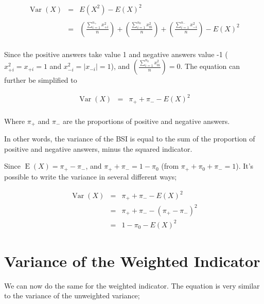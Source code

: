 \documentclass[12pt,a4paper,oneside]{book}
\DeclareMathOperator{\Var}{Var}
\DeclareMathOperator{\E}{E}
\begin{document}
\begin{eqnarray}
\Var(X) &=&  E\left( X^2\right) - E\left( X\right)^2 \nonumber \\ \nonumber \\
    &=& \left( \frac{\sum_{i=1}^{n_+} x_{+i}^2}{n} \right)  + \left( \frac{\sum_{i=1}^{n_0} x_{0i}^2}{n} \right) + \left( \frac{\sum_{i=1}^{n_-} x_{-i}^2}{n} \right) - E(X)^2 \\ \nonumber 
\end{eqnarray}


Since the positive answers take value 1 and negative answers value -1 ($x_{+i}^2 = x_{+i} = 1$ and $x_{-i}^2 = |x_{-i}| = 1$), and $\left( \frac{\sum_{i=1}^{n_0} x_{0i}^2}{n} \right) = 0$. 
The equation can further be simplified to

\begin{eqnarray}
    \Var(X) &=& \pi_+ + \pi_- - E ( X )^2 \label{var1} \\ \nonumber
\end{eqnarray}

Where $\pi_+$ and $\pi_-$ are the proportions of positive and negative answers.

In other words, the variance of the BSI is equal to the sum of the proportion of positive and negative answers, minus the squared indicator.

Since $\E(X)=\pi_+ - \pi_-$, and $\pi_+ + \pi_- = 1 - \pi_0$ (from $\pi_+ + \pi_0 + \pi_- = 1$).
It's possible to write the variance in several different ways;


\begin{eqnarray}
\Var(X) &=& \pi_+ + \pi_- - E ( X )^2  \nonumber \\
        &=& \pi_+ + \pi_- - ( \pi_+ - \pi_- )^2 \label{eq:var2} \\
        &=& 1 - \pi_0 - E(X)^2 \label{eq:var3}
\end{eqnarray}




\section{Variance of the Weighted Indicator}

We can now do the same for the weighted indicator. The equation is very similar to the variance of the unweighted variance;
\end{document}
